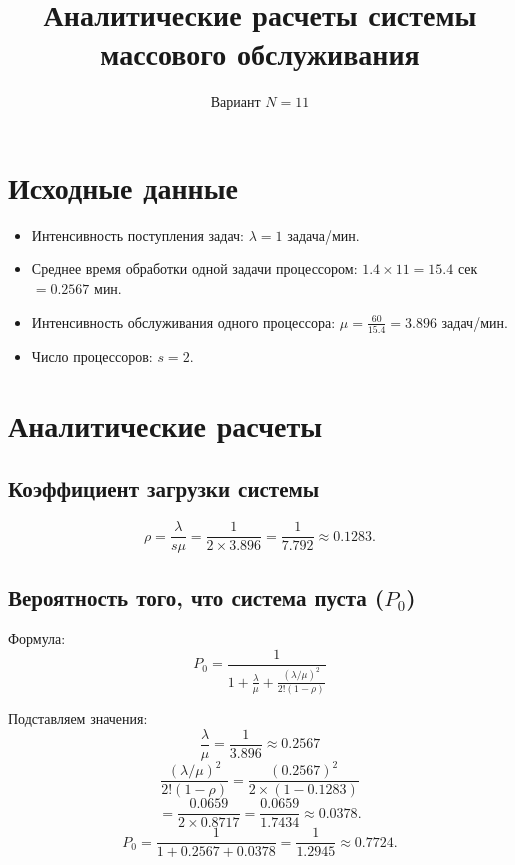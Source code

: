 \documentclass[a4paper,12pt]{article}
\begin{document}
\title{Аналитические расчеты системы массового обслуживания}
\author{Вариант $N = 11$}
\date{}
\maketitle

\section{Исходные данные}
\begin{itemize}
    \item Интенсивность поступления задач: $\lambda = 1$ задача/мин.
    \item Среднее время обработки одной задачи процессором: $1.4 \times 11 = 15.4$ сек $= 0.2567$ мин.
    \item Интенсивность обслуживания одного процессора: $\mu = \frac{60}{15.4} = 3.896$ задач/мин.
    \item Число процессоров: $s = 2$.
\end{itemize}

\section{Аналитические расчеты}

\subsection{Коэффициент загрузки системы}
\begin{equation}
    \rho = \frac{\lambda}{s \mu} = \frac{1}{2 \times 3.896} = \frac{1}{7.792} \approx 0.1283.
\end{equation}

\subsection{Вероятность того, что система пуста ($P_0$)}
Формула:
\begin{equation}
    P_0 = \frac{1}{1 + \frac{\lambda}{\mu} + \frac{(\lambda/\mu)^2}{2! (1 - \rho)}}
\end{equation}

Подставляем значения:
\begin{equation}
    \frac{\lambda}{\mu} = \frac{1}{3.896} \approx 0.2567
\end{equation}
\begin{equation}
    \frac{(\lambda/\mu)^2}{2! (1 - \rho)} = \frac{(0.2567)^2}{2 \times (1 - 0.1283)}
\end{equation}
\begin{equation}
    = \frac{0.0659}{2 \times 0.8717} = \frac{0.0659}{1.7434} \approx 0.0378.
\end{equation}
\begin{equation}
    P_0 = \frac{1}{1 + 0.2567 + 0.0378} = \frac{1}{1.2945} \approx 0.7724.
\end{equation}
\end{document}
